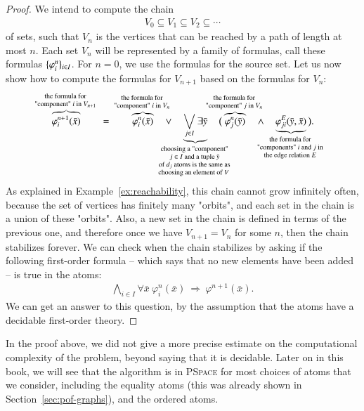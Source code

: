 \begin{proof}
	We intend to compute 
	the chain 
	\begin{align*}
	V_0 \subseteq V_1 \subseteq V_2 \subseteq \cdots
	\end{align*}
	of sets, such that $V_n$ is the vertices that can be reached by a path of length at most $n$. Each set $V_n$ will be represented by a family of formulas, call these formulas $\{\varphi_i^n\}_{i \in I}$. For $n=0$, we use the formulas for the source set. Let us now show how to compute the formulas for $V_{n+1}$ based on the formulas for  $V_n$:
	\begin{align*}
		\myoverbrace{\varphi^{n+1}_i(\bar x )}{the  formula for \\ "component" $i$ in $V_{n+1}$}
		\qquad = \qquad 
		\myoverbrace{\varphi^n_i(\bar x )}{the  formula for \\ "component" $i$ in $V_n$}
		\quad  \vee \quad  \myunderbrace{\bigvee_{j \in I} \exists \bar y}{choosing a "component"\\ $j \in I$ and a tuple $\bar y$ \\ of $d_j$ atoms is the same as \\ choosing an element of $V$ }
	\quad   \big(\myoverbrace{\varphi^n_j(\bar y )}{the  formula for\\ "component" $j$ in $V_n$}
	\quad  \land \quad  \myunderbrace{\varphi^E_{ji}(\bar y,\bar x)}{the formula for  \\ "components" $i$ and $j$  in \\ the edge relation $E$} \big).
	\end{align*}
	As explained in Example~\ref{ex:reachability}, this chain cannot grow infinitely often, because the set of vertices has finitely many "orbits", and each set in the chain is a union of these "orbits". Also, a new set in the chain is defined in terms of the previous one, and therefore once we have $V_{n+1} = V_n$ for some $n$, then the chain stabilizes forever. We can check when the chain stabilizes by asking if the following first-order formula -- which says that no new elements have been added -- is true in the atoms:
	\begin{align*}
	\bigwedge_{i \in I} \forall \bar x \ \varphi_i^n(\bar x) \ \Rightarrow \ \varphi^{n+1}(\bar x).
	\end{align*} 
	We can get an answer to this question, by the assumption that the atoms have a decidable first-order theory. 
\end{proof}

In the proof above, we did not give a more precise estimate on the computational complexity of the problem, beyond saying that it is decidable. Later on in this book, we will see that the algorithm is in \textsc{PSpace} for most choices of atoms that we consider, including the equality atoms (this was already shown in Section~\ref{sec:pof-graphs}), and the ordered atoms.




